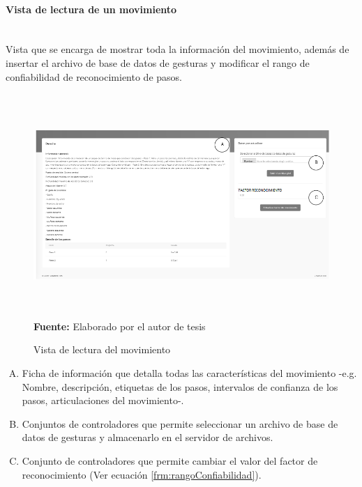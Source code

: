 \paragraph{Vista de lectura de un movimiento}\mbox{} \\ \label{ins:UI:web:read}
Vista que se encarga de mostrar toda la informaci\'on del movimiento, adem\'as de insertar el archivo de base de datos de gesturas y modificar el rango de confiabilidad de reconocimiento de pasos.
\begin{figure}[H]
	\caption{Vista de lectura del movimiento}
	\label{fig:viewRead}
	\centering
	\includegraphics[width=460px,height=320px]{graphics/web-read.PNG} \\
	\textbf{Fuente:} Elaborado por el autor de tesis
\end{figure}
\begin{enumerate}[A.]
\item Ficha de informaci\'on que detalla todas las caracter\'isticas del movimiento -e.g. Nombre, descripci\'on, etiquetas de los pasos, intervalos de confianza de los pasos, articulaciones del movimiento-.
\item Conjuntos de controladores que permite seleccionar un archivo de base de datos de gesturas y almacenarlo en el servidor de archivos.
\item Conjunto de controladores que permite cambiar el valor del factor de reconocimiento (Ver ecuaci\'on \ref{frm:rangoConfiabilidad}).
\end{enumerate}
